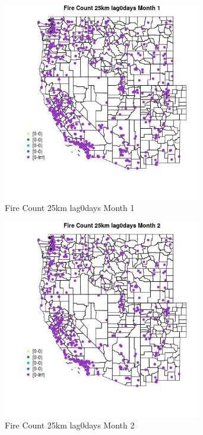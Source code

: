 \begin{figure} 
\centering  
\includegraphics[width=0.77\textwidth]{Code_Outputs/Report_ML_input_PM25_Step4_part_e_de_duplicated_aves_compiled_2019-05-18wNAs_MapObsMo1Fire_Count_25km_lag0days.jpg} 
\caption{\label{fig:Report_ML_input_PM25_Step4_part_e_de_duplicated_aves_compiled_2019-05-18wNAsMapObsMo1Fire_Count_25km_lag0days}Fire Count 25km lag0days Month 1} 
\end{figure} 
 

\clearpage 

\begin{figure} 
\centering  
\includegraphics[width=0.77\textwidth]{Code_Outputs/Report_ML_input_PM25_Step4_part_e_de_duplicated_aves_compiled_2019-05-18wNAs_MapObsMo2Fire_Count_25km_lag0days.jpg} 
\caption{\label{fig:Report_ML_input_PM25_Step4_part_e_de_duplicated_aves_compiled_2019-05-18wNAsMapObsMo2Fire_Count_25km_lag0days}Fire Count 25km lag0days Month 2} 
\end{figure} 
 

